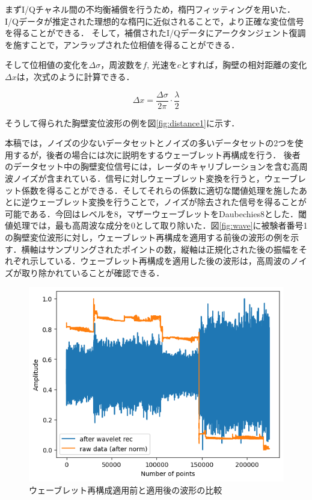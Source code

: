 まずI/Qチャネル間の不均衡補償を行うため，楕円フィッティングを用いた．I/Qデータが推定された理想的な楕円に近似されることで，より正確な変位信号を得ることができる\cite{paper:ellipse1}\cite{paper:ellipse2}．
そして，補償されたI/Qデータにアークタンジェント復調を施すことで，アンラップされた位相値を得ることができる．

そして位相値の変化を$\Delta \sigma$，周波数を$f$, 光速を$c$とすれば，胸壁の相対距離の変化$\Delta x$は，次式のように計算できる．

\begin{equation}
	\Delta x = \frac{\Delta \sigma}{2 \pi} \cdot \frac{\lambda}{2}
\end{equation}

そうして得られた胸壁変位波形の例を図\ref{fig:distance1}に示す．

本稿では，ノイズの少ないデータセットとノイズの多いデータセットの2つを使用するが，後者の場合には次に説明をするウェーブレット再構成を行う．
後者のデータセット中の胸壁変位信号には，レーダのキャリブレーションを含む高周波ノイズが含まれている．信号に対しウェーブレット変換を行うと，ウェーブレット係数を得ることができる．そしてそれらの係数に適切な閾値処理を施したあとに逆ウェーブレット変換を行うことで，ノイズが除去された信号を得ることが可能である．今回はレベルを8，マザーウェーブレットをDaubechies8とした．閾値処理では，最も高周波な成分を0として取り除いた．図\ref{fig:wave}に被験者番号1の胸壁変位波形に対し，ウェーブレット再構成を適用する前後の波形の例を示す．横軸はサンプリングされたポイントの数，縦軸は正規化された後の振幅をそれぞれ示している．ウェーブレット再構成を適用した後の波形は，高周波のノイズが取り除かれていることが確認できる．

\begin{figure}[H]
\begin{center}
\includegraphics[width=\linewidth]{./fig/comparison_raw_wavelet_ID01.png}
\end{center}
\caption{ウェーブレット再構成適用前と適用後の波形の比較}
\end{figure}

